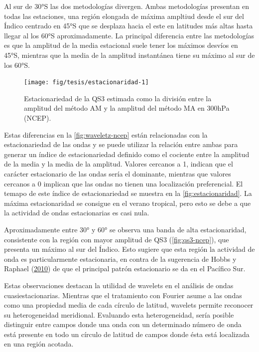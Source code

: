 \documentclass[spanish,a4paper,12pt,oneside]{book}
\begin{document}
Al sur de 30°S las dos metodologías divergen. Ambas metodologías
presentan en todas las estaciones, una región elongada de máxima
ampltiud desde el sur del Índico centrado en 45°S que se desplaza hacia
el este en latitudes más altas hasta llegar al los 60°S aproximadamente.
La principal diferencia entre las metodologías es que la amplitud de la
media estacional suele tener los máximos desvíos en 45°S, mientras que
la media de la amplitud instantánea tiene su máximo al sur de los 60°S.

\begin{figure}
\texttt{[image: fig/tesis/estacionaridad-1]} \caption{Estacionariedad de la QS3 estimada como la división entre la amplitud del método AM y la amplitud del método MA en 300hPa (NCEP).}\label{fig:estacionaridad}
\end{figure}

Estas diferencias en la \autoref{fig:waveletz-ncep} están relacionadas
con la estacionariedad de las ondas y se puede utilizar la relación
entre ambas para generar un índice de estacionariedad definido como el
cociente entre la amplitud de la media y la media de la amplitud.
Valores cercanos a 1, indican que el carácter estacionario de las ondas
sería el dominante, mientras que valores cercanos a 0 implican que las
ondas no tienen una localización preferencial. El temapo de este índice
de estacionariedad se muestra en la \autoref{fig:estacionaridad}. La
máxima estacionaridad se consigue en el verano tropical, pero esto se
debe a que la actividad de ondas estacionarias es casi nula.

Aproximadamente entre 30° y 60° se observa una banda de alta
estacionaridad, consistente con la región con mayor amplitud de QS3
(\autoref{fig:qs3-ncep}), que presenta un máximo al sur del Índico. Esto
sugiere que esta región la actividad de onda es particularmente
estacionaria, en contra de la sugerencia de Hobbs y Raphael
(\protect\hyperlink{ref-Hobbs2010}{2010}) de que el principal patrón
estacionario se da en el Pacífico Sur.

Estas observaciones destacan la utilidad de wavelets en el análisis de
ondas cuasiestacionarias. Mientras que el tratamiento con Fourier asume
a las ondas como una propiedad media de cada círculo de latitud,
wavelets permite reconocer su heterogeneidad meridional. Evaluando esta
heterogeneidad, sería posible distinguir entre campos donde una onda con
un determinado número de onda está presente en todo un círculo de
latitud de campos donde ésta está localizada en una región acotada.
\end{document}
